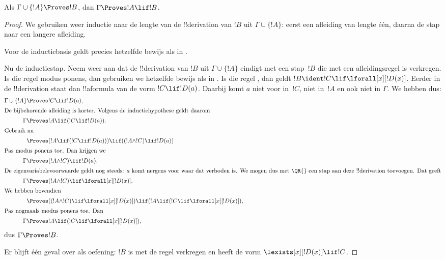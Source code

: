 \documentclass[openany]{memoir}
\begin{document}
\begin{thm}
 Als $\Gamma \cup \{!A\} \Proves !B$,
dan $\Gamma \Proves !A \lif !B$.
\end{thm}

\begin{proof}
We gebruiken weer inductie naar de lengte van de !!{derivation} van
$!B$ uit $\Gamma \cup \{!A\}$: eerst een afleiding van lengte één,
daarna de stap naar een langere afleiding.

Voor de inductiebasis geldt precies hetzelfde bewijs als in
.

Nu de inductiestap. Neem weer aan dat de !!{derivation} van $!B$ uit
$\Gamma \cup \{!A\}$ eindigt met een stap~$!B$ die met een
afleidingsregel is verkregen. Is die regel modus ponens, dan gebruiken
we hetzelfde bewijs als in . Is die regel
\QR, dan geldt $!B \ident !C \lif \lforall[x][!D(x)]$. Eerder in de
!!{derivation} staat dan !!a{formula} van de vorm $!C \lif !D(a)$.
Daarbij komt $a$ niet voor in~$!C$, niet in~$!A$ en ook niet in
$\Gamma$. We hebben dus:
\begin{align*}
  \Gamma \cup \{!A\} & \Proves !C \lif !D(a),\\
  \intertext{De bijbehorende afleiding is korter. Volgens de inductiehypothese geldt daarom}
    \Gamma & \Proves !A \lif (!C \lif !D(a)).\\
  \intertext{Gebruik nu}
  & \Proves (!A \lif (!C \lif !D(a))) \lif ((!A \land !C) \lif !D(a))\\
  \intertext{Pas modus ponens toe. Dan krijgen we}
  \Gamma & \Proves (!A \land !C) \lif !D(a).\\
  \intertext{De eigenvariabelevoorwaarde geldt nog steeds: $a$ komt nergens voor waar dat verboden is. We mogen dus met \QR{} een stap aan deze !!{derivation} toevoegen. Dat geeft}
    \Gamma & \Proves (!A \land !C) \lif \lforall[x][!D(x)].\\
    \intertext{We hebben bovendien}
    & \Proves ((!A \land !C) \lif \lforall[x][!D(x)]) \lif (!A \lif (!C \lif \lforall[x][!D(x)]),\\
    \intertext{Pas nogmaals modus ponens toe. Dan}
    \Gamma & \Proves !A \lif (!C \lif \lforall[x][!D(x)]),
\end{align*}
dus $\Gamma \Proves !B$.

Er blijft één geval over als oefening: $!B$ is met de regel \QR{}
verkregen en heeft de vorm $\lexists[x][!D(x)] \lif !C$.
\end{proof}
\end{document}
